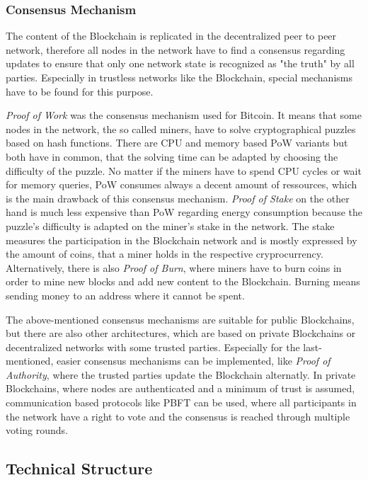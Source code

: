 \documentclass[conference]{IEEEtran}
\begin{document}
\subsubsection{Consensus Mechanism}
The content of the Blockchain is replicated in the decentralized peer to peer network, therefore all nodes in the network have to find a consensus regarding updates to ensure that only one network state is recognized as "the truth" by all parties. Especially in trustless networks like the Blockchain, special mechanisms have to be found for this purpose. \cite{Dinh?}\par 
\textit{Proof of Work} was the consensus mechanism used for Bitcoin. It means that some nodes in the network, the so called miners, have to solve cryptographical puzzles based on hash functions. There are CPU and memory based PoW variants but both have in common, that the solving time can be adapted by choosing the difficulty of the puzzle. No matter if the miners have to spend CPU cycles or wait for memory queries, PoW consumes always a decent amount of ressources, which is the main drawback of this consensus mechanism. \cite{Dinh?} \cite{Golze2009}
\textit{Proof of Stake} on the other hand is much less expensive than PoW regarding energy consumption because the puzzle's difficulty is adapted on the miner's stake in the network. The stake measures the participation in the Blockchain network and is mostly expressed by the amount of coins, that a miner holds in the respective cryprocurrency. Alternatively, there is also \textit{Proof of Burn}, where miners have to burn coins in order to mine new blocks and add new content to the Blockchain. Burning means sending money to an address where it cannot be spent. \cite{Dinh?} \par
The above-mentioned consensus mechanisms are suitable for public Blockchains, but there are also other architectures, which are based on private Blockchains or decentralized networks with some trusted parties. Especially for the last-mentioned, easier consensus mechanisms can be implemented, like \textit{Proof of Authority}, where the trusted parties update the Blockchain alternatly. In private Blockchains, where nodes are authenticated and a minimum of trust is assumed, communication based protocols like PBFT can be used, where all participants in the network have a right to vote and the consensus is reached through multiple voting rounds. \cite{Dinh?} \par 

\subsection{Technical Structure}
\end{document}
